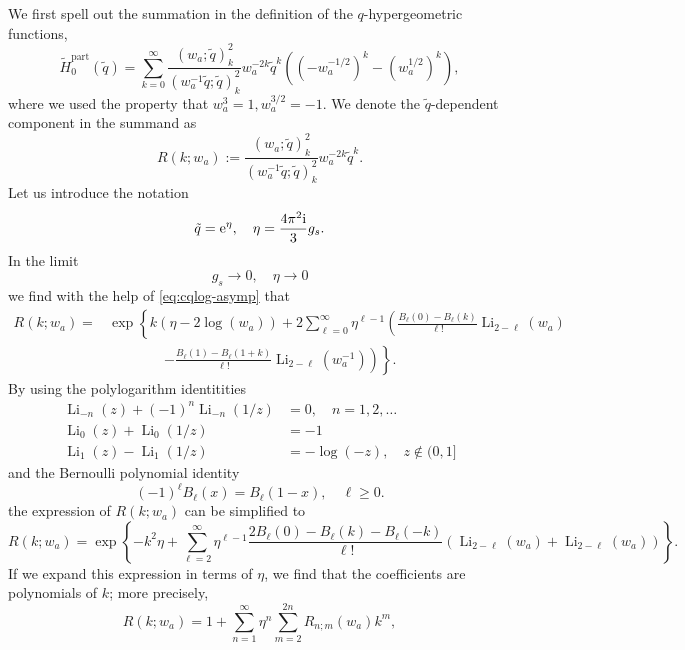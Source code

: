\documentclass[a4paper,11pt]{article}
\theoremstyle{definition}
\newcommand{\re}{{\rm e}}
\newcommand{\ri}{{\rm i}}
\def\tq{{\tilde{q}}}
\newcommand{\wt}[1]{\widetilde{#1}}
\newcommand{\nn}{\nonumber \\}
\DeclareMathOperator{\Li}{Li}
\begin{document}
We first spell out the summation in the definition of
the $q$-hypergeometric functions,
%
\begin{equation}
  \wt{H}^{\text{part}}_0(\tq) = \sum_{k=0}^\infty
  \frac{(w_a;\tq)_k^2}{(w_a^{-1}\tq;\tq)_k^2}w_a^{-2k}\tq^k
  \left( (-w_a^{-1/2})^k - (w_a^{1/2})^k\right),
\end{equation}
where we used the property that $w_a^3 = 1, w_a^{3/2} = -1$.
We denote the $\tq$-dependent component in the summand as
\begin{equation}
  R(k;w_a) :=\frac{(w_a;\tq)_{k}^2}
  {(w_a^{-1}\tq;\tq)_{k}^2}w_a^{-2k}\tq^k.
\end{equation}
Let us introduce the notation
\begin{equation}
  \tq = \re^{\eta},\quad \eta = \frac{4\pi^2\ri}{3} g_s.
\end{equation}
In the limit
\begin{equation}
  g_s \rightarrow 0,\quad \eta \rightarrow 0
\end{equation}
we find with the help of \eqref{eq:cqlog-asymp} that
\begin{align}
  R(k;w_a) =
  &\exp \left\{k(\eta-2\log(w_a))+
    2\sum_{\ell=0}^\infty \eta^{\ell-1}
    \left(\frac{B_\ell(0)-B_\ell(k)}{\ell!}
    \Li_{2-\ell}(w_a)\right.\right.\nn
  &\phantom{===}\left.\left.-\frac{B_\ell(1)-B_\ell(1+k)}{\ell!}
    \Li_{2-\ell}(w_a^{-1})\right)\right\}. 
\end{align}
By using the polylogarithm identitities
\begin{align}
  \Li_{-n}(z)+(-1)^n\Li_{-n}(1/z)
  &= 0,\quad n=1,2,\ldots\nn
    \Li_{0}(z) + \Li_0(1/z)
  &= -1\nn
    \Li_{1}(z) - \Li_1(1/z)
  &= -\log(-z),\quad z\not\in (0,1]
    \label{eq:Li-id}
\end{align}
and the Bernoulli polynomial identity
\begin{equation}
  (-1)^\ell B_{\ell}(x) = B_{\ell}(1-x), \quad \ell \geq 0.
  \label{eq:B-id}
\end{equation}
the expression of $R(k;w_a)$ can be simplified to
\begin{equation}
  R(k;w_a)= \exp\left\{-k^2\eta + \sum_{\ell=2}^\infty \eta^{\ell-1}
    \frac{2B_\ell(0) - B_\ell(k) - B_\ell(-k)}{\ell !}
    (\Li_{2-\ell}(w_a)+\Li_{2-\ell}(w_a))
  \right\}.
  \label{eq:Rk-simp}
\end{equation}
%
If we expand this expression in terms of $\eta$, we find that the
coefficients are polynomials of $k$; more precisely,
\begin{equation}
  R(k;w_a) =
  1+ \sum_{n=1}^\infty \eta^n \sum_{m=2}^{2n} R_{n;m}(w_a)k^m, 
  \label{eq:Rk}
\end{equation}
\end{document}
